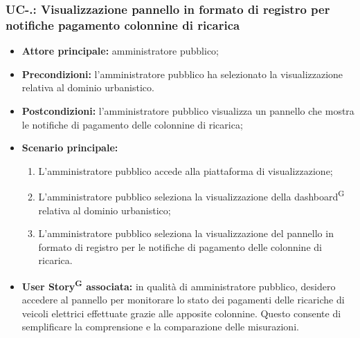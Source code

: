 \documentclass[8pt]{article}
\newcommand{\glossterm}[1]{#1\textsuperscript{G}} %
\begin{document}
\subsubsection*{UC-\theuc .\speconenumber: Visualizzazione pannello in formato di registro per notifiche pagamento colonnine di ricarica}
\begin{itemize}
    \item \textbf{Attore principale:} amministratore pubblico;
    \item \textbf{Precondizioni:} l’amministratore pubblico ha selezionato la visualizzazione
        relativa al dominio urbanistico.
    \item \textbf{Postcondizioni:} l'amministratore pubblico visualizza un pannello che mostra le notifiche di pagamento delle colonnine di ricarica;
    \item \textbf{Scenario principale:} 
    \begin{enumerate}
    \item L’amministratore pubblico accede alla piattaforma di visualizzazione;
    \item L’amministratore pubblico seleziona la visualizzazione della \glossterm{dashboard} relativa al dominio urbanistico;
    \item L’amministratore pubblico seleziona la visualizzazione del pannello in formato di registro per le notifiche di pagamento delle colonnine di ricarica.
    \end{enumerate}
    \item \textbf{\glossterm{User Story} associata:} in qualità di amministratore pubblico, desidero accedere al pannello per monitorare lo stato dei pagamenti delle ricariche di veicoli elettrici effettuate grazie alle apposite colonnine. Questo consente di semplificare la comprensione e la comparazione delle misurazioni.
\end{itemize}
\end{document}
